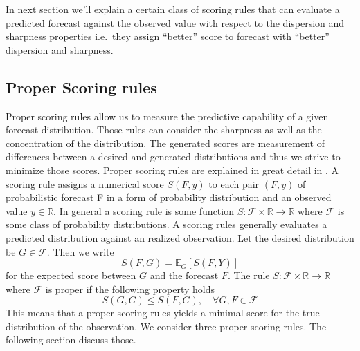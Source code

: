 \documentclass[12pt,a4paper,twoside]{scrartcl}
\numberwithin{equation}{section}
\begin{document}
In next section we'll explain a certain class of scoring rules that can evaluate a predicted forecast against the observed value with respect to the dispersion and sharpness properties i.e.\ they assign ``better'' score to forecast with ``better'' dispersion and sharpness.
\subsection{Proper Scoring rules}\label{sec:proper-scoring-rules}
Proper scoring rules allow us to measure the predictive capability of a given forecast distribution. Those rules can consider the sharpness as well as the concentration of the distribution. The generated scores are measurement of differences between a desired and generated distributions and thus we strive to minimize those scores. Proper scoring rules are explained in great detail in \cite{gneiting2007}.
A scoring rule assigns a numerical score \(S(F, y)\) to each pair \((F, y)\) of probabilistic forecast F in a form of probability distribution and an observed value \(y \in \mathbb{R}\). In general a scoring rule is some function \(S:\mathcal{F} \times \mathbb{R} \rightarrow \mathbb{R}\) where \(\mathcal{F}\) is some class of probability distributions. A scoring rules generally evaluates a predicted distribution against an realized observation. Let the desired distribution be \(G\in\mathcal{F}\). Then we write
\begin{equation}
  S(F,G) =\mathbb{E}_G[S(F,Y)]
\end{equation}
for the expected score between \(G\) and the forecast \(F\). 
The rule \(S: \mathcal{F} \times \mathbb{R} \rightarrow \mathbb{R}\) where \(\mathcal{F}\) is proper if the following property holds
\begin{equation}
  S(G,G) \leq S(F,G),\quad \forall G,F \in \mathcal{F}
\end{equation}
This means that a proper scoring rules yields a minimal score for the true distribution of the observation.
We consider three proper scoring rules. The following section discuss those.
\end{document}
